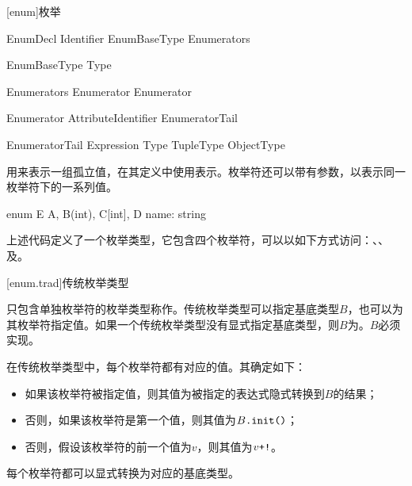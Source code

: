 
[enum]{枚举}

\begin{bnf}{EnumDecl}
     Identifier EnumBaseType\bnfq \terminal{\{} Enumerators \terminal{\}}
\end{bnf}

\begin{bnf}{EnumBaseType}
    \terminal{:} Type
\end{bnf}

\begin{bnf}{Enumerators}
    Enumerator \bnflp \terminal{,} Enumerator \bnfrp\bnfs \terminal{,}\bnfq
\end{bnf}

\begin{bnf}{Enumerator}
    Attribute\bnfq Identifier EnumeratorTail\bnfq
\end{bnf}

\begin{bnf}{EnumeratorTail}
    \terminal{=} Expression \br
    \terminal{[} Type \terminal{]} \br
    TupleType \br
    ObjectType
\end{bnf}

\pnum
{}用来表示一组孤立值，在其定义中使用表示。枚举符还可以带有参数，以表示同一枚举符下的一系列值。

\enterexample
\begin{codeblock}

enum E {
    A,
    B(int),
    C[int],
    D{ name: string }
}

\end{codeblock}

上述代码定义了一个枚举类型，它包含四个枚举符，可以以如下方式访问：、、及。
\exitexample

[enum.trad]{传统枚举类型}

\pnum
只包含单独枚举符的枚举类型称作。传统枚举类型可以指定基底类型$B$，也可以为其枚举符指定值。如果一个传统枚举类型没有显式指定基底类型，则$B$为。$B$必须实现。

\pnum
在传统枚举类型中，每个枚举符都有对应的值。其确定如下：

\begin{itemize}
    \item 如果该枚举符被指定值，则其值为被指定的表达式隐式转换到$B$的结果；
    \item 否则，如果该枚举符是第一个值，则其值为$B\texttt{.init()}$；
    \item 否则，假设该枚举符的前一个值为$v$，则其值为$v\texttt{+!}$。
\end{itemize}

每个枚举符都可以显式转换为对应的基底类型。